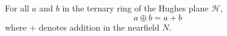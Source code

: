 For all $a$ and $b$ in the ternary ring of the Hughes plane $\mathcal{H}$,
$$a \oplus b = a + b$$
where $+$ denotes addition in the nearfield $N$.
